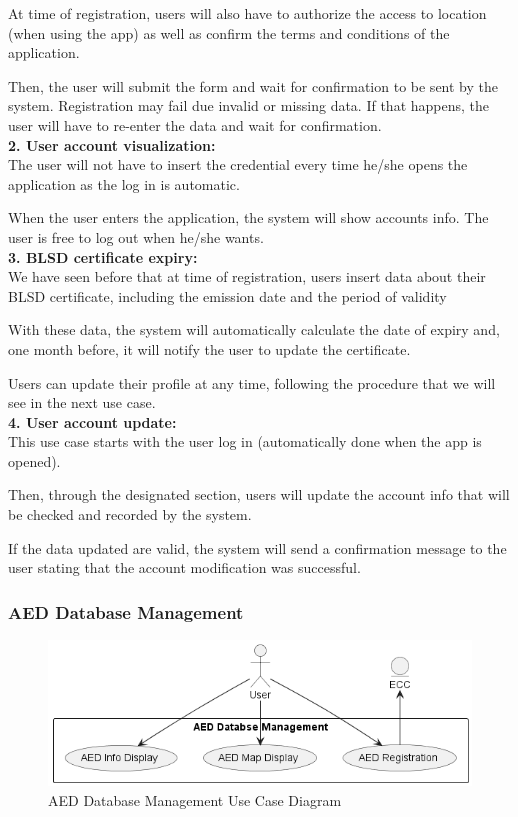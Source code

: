 \documentclass[11pt,a4paper]{article}
\begin{document}
At time of registration, users will also have to authorize the access to location (when using the app) as well as confirm the terms and conditions of the application.

Then, the user will submit the form and wait for confirmation to be sent by the system.
%
Registration may fail due invalid or missing data.
%
If that happens, the user will have to re-enter the data and wait for confirmation. \\

\textbf{2. User account visualization:} \\

The user will not have to insert the credential every time he/she opens the application as the log in is automatic.

When the user enters the application, the system will show accounts info.
%
The user is free to log out when he/she wants. \\

\textbf{3. BLSD certificate expiry:} \\

We have seen before that at time of registration, users insert data about their BLSD certificate, including the emission date and the period of validity

With these data, the system will automatically calculate the date of expiry and, one month before, it will notify the user to update the certificate.

Users can update their profile at any time, following the procedure that we will see in the next use case. \\

\textbf{4. User account update:} \\

This use case starts with the user log in (automatically done when the app is opened).

Then, through the designated section, users will update the account info that will be checked and recorded by the system.

If the data updated are valid, the system will send a confirmation message to the user stating that the account modification was successful.

\subsubsection{AED Database Management}

\begin{figure}
    \centering
    \includegraphics[scale=0.7, width=\textwidth]{images/uml-aed.png}
    \caption{AED Database Management Use Case Diagram}
    \label{fig:uml-aed}
\end{figure}
\end{document}
